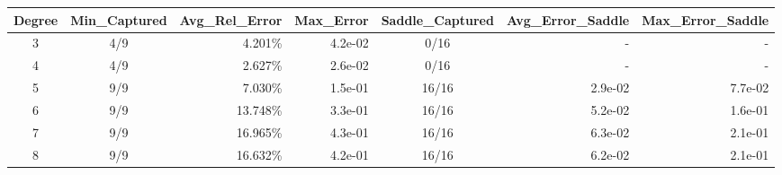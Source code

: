 \begin{tabular}{ccrrcrr}
  \toprule
  \textbf{Degree} & \textbf{Min\_Captured} & \textbf{Avg\_Rel\_Error} & \textbf{Max\_Error} & \textbf{Saddle\_Captured} & \textbf{Avg\_Error\_Saddle} & \textbf{Max\_Error\_Saddle} \\\midrule
  3 & 4/9 & 4.201\% & 4.2e-02 & 0/16 & - & - \\
  4 & 4/9 & 2.627\% & 2.6e-02 & 0/16 & - & - \\
  5 & 9/9 & 7.030\% & 1.5e-01 & 16/16 & 2.9e-02 & 7.7e-02 \\
  6 & 9/9 & 13.748\% & 3.3e-01 & 16/16 & 5.2e-02 & 1.6e-01 \\
  7 & 9/9 & 16.965\% & 4.3e-01 & 16/16 & 6.3e-02 & 2.1e-01 \\
  8 & 9/9 & 16.632\% & 4.2e-01 & 16/16 & 6.2e-02 & 2.1e-01 \\\bottomrule
\end{tabular}
